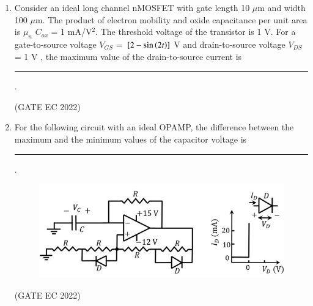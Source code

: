\documentclass[journal,12pt,onecolumn]{IEEEtran}
\theoremstyle{remark}
\begin{document}
\begin{enumerate}
    \item Consider an ideal long channel nMOSFET  with gate length 10 $\mu$m and width 100 $\mu$m. The product of electron mobility  and oxide capacitance per unit area  is $\mu_n$ $C_{ox}$ = 1 mA/V$^2$. The threshold voltage of the transistor is 1 V. For a gate-to-source voltage $V_{GS}$ = ${}\left[2 - \sin\left(2t\right)\right]$ V and drain-to-source voltage $V_{DS}$ = 1 V , the maximum value of the drain-to-source current is \rule{2cm}{0.4pt}.
    
    \hfill{(GATE EC 2022)}
    \begin{enumerate}
    \end{enumerate}
    
    \item For the following circuit  with an ideal OPAMP, the difference between the maximum and the minimum values of the capacitor voltage  is \rule{2cm}{0.4pt}.
    \begin{figure}[H]
        \centering
        \includegraphics[width=0.9\columnwidth]{figs/m19.jpg}
        \caption*{}
        \label{fig:m19}
    \end{figure}
    
    \hfill{(GATE EC 2022)}
    \begin{enumerate}
    \end{enumerate}


\end{enumerate}
\end{document}
